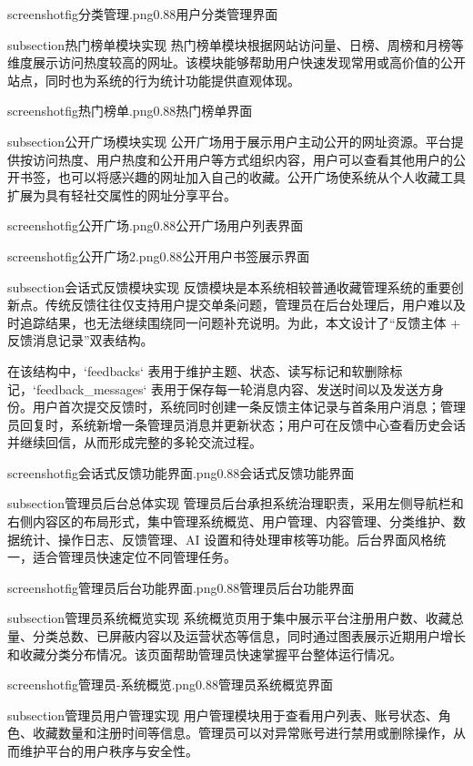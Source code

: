 screenshotfig{分类管理.png}{0.88}{用户分类管理界面}

subsection{热门榜单模块实现}
热门榜单模块根据网站访问量、日榜、周榜和月榜等维度展示访问热度较高的网址。该模块能够帮助用户快速发现常用或高价值的公开站点，同时也为系统的行为统计功能提供直观体现。

screenshotfig{热门榜单.png}{0.88}{热门榜单界面}

subsection{公开广场模块实现}
公开广场用于展示用户主动公开的网址资源。平台提供按访问热度、用户热度和公开用户等方式组织内容，用户可以查看其他用户的公开书签，也可以将感兴趣的网址加入自己的收藏。公开广场使系统从个人收藏工具扩展为具有轻社交属性的网址分享平台。

screenshotfig{公开广场.png}{0.88}{公开广场用户列表界面}

screenshotfig{公开广场2.png}{0.88}{公开用户书签展示界面}

subsection{会话式反馈模块实现}
反馈模块是本系统相较普通收藏管理系统的重要创新点。传统反馈往往仅支持用户提交单条问题，管理员在后台处理后，用户难以及时追踪结果，也无法继续围绕同一问题补充说明。为此，本文设计了“反馈主体 + 反馈消息记录”双表结构。

在该结构中，`feedbacks` 表用于维护主题、状态、读写标记和软删除标记，`feedback_messages` 表用于保存每一轮消息内容、发送时间以及发送方身份。用户首次提交反馈时，系统同时创建一条反馈主体记录与首条用户消息；管理员回复时，系统新增一条管理员消息并更新状态；用户可在反馈中心查看历史会话并继续回信，从而形成完整的多轮交流过程。

screenshotfig{会话式反馈功能界面.png}{0.88}{会话式反馈功能界面}

subsection{管理员后台总体实现}
管理员后台承担系统治理职责，采用左侧导航栏和右侧内容区的布局形式，集中管理系统概览、用户管理、内容管理、分类维护、数据统计、操作日志、反馈管理、AI 设置和待处理审核等功能。后台界面风格统一，适合管理员快速定位不同管理任务。

screenshotfig{管理员后台功能界面.png}{0.88}{管理员后台功能界面}

subsection{管理员系统概览实现}
系统概览页用于集中展示平台注册用户数、收藏总量、分类总数、已屏蔽内容以及运营状态等信息，同时通过图表展示近期用户增长和收藏分类分布情况。该页面帮助管理员快速掌握平台整体运行情况。

screenshotfig{管理员-系统概览.png}{0.88}{管理员系统概览界面}

subsection{管理员用户管理实现}
用户管理模块用于查看用户列表、账号状态、角色、收藏数量和注册时间等信息。管理员可以对异常账号进行禁用或删除操作，从而维护平台的用户秩序与安全性。

